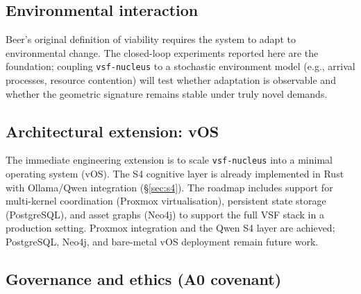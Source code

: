 \documentclass[11pt, a4paper]{article}
\newcommand{\nucleus}{\texttt{vsf-nucleus}}
\begin{document}
\subsection*{Environmental interaction}

Beer's original definition of viability requires the system to adapt
to environmental change. The closed-loop experiments reported here
are the foundation; coupling \nucleus{} to a stochastic environment
model (e.g., arrival processes, resource contention) will test
whether adaptation is observable and whether the geometric signature
remains stable under truly novel demands.

\subsection*{Architectural extension: vOS}

The immediate engineering extension is to scale \nucleus{} into a
minimal operating system (vOS). The S4 cognitive layer is already
implemented in Rust with Ollama/Qwen integration (\S\ref{sec:s4}).
The roadmap includes support for multi-kernel coordination (Proxmox
virtualisation), persistent state storage (PostgreSQL), and asset
graphs (Neo4j) to support the full VSF stack in a production setting.
Proxmox integration and the Qwen S4 layer are achieved; PostgreSQL,
Neo4j, and bare-metal vOS deployment remain future work.

\subsection*{Governance and ethics (A0 covenant)}
\end{document}
